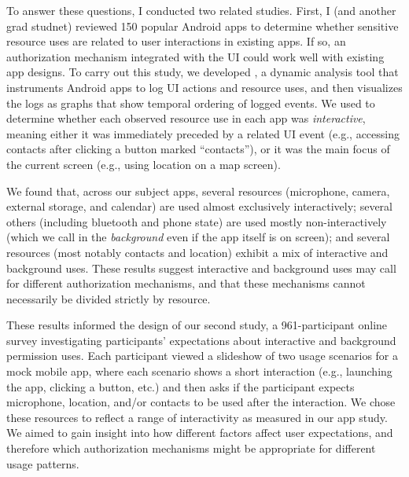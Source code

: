 To answer these questions, I conducted two related studies. First, I
(and another grad studnet) reviewed 150 popular Android apps to
determine whether sensitive resource uses are related to user
interactions in existing apps.  If so, an authorization mechanism
integrated with the UI could work well with existing app designs.  To
carry out this study, we developed \apptracer{}, a dynamic analysis
tool that instruments Android apps to log UI actions and resource
uses, and then visualizes the logs as graphs that show temporal
ordering of logged events.
We used \apptracer{} to determine whether each observed
resource use in each app was \emph{interactive}, meaning either it was
immediately preceded by a related UI event (e.g., accessing contacts
after clicking a button marked ``contacts''), or it was the main focus of
the current screen (e.g., using location on a map screen). 

We found that, across our subject apps, several resources (microphone,
camera, external storage, and calendar) are used almost exclusively
interactively; several others (including bluetooth and phone state)
are used mostly non-interactively (which we call in the
\emph{background} even if the app itself is on screen); and several
resources (most notably contacts and location) exhibit a mix of
interactive and background uses. These results suggest interactive and
background uses may call for different authorization mechanisms, and
that these mechanisms cannot necessarily be divided strictly by
resource.


These results informed the design of our second study, a
961-participant online survey investigating participants' expectations
about interactive and background permission uses. Each participant
viewed a slideshow of two usage scenarios for a mock mobile app, where
each scenario shows a short interaction (e.g., launching the app,
clicking a button, etc.) and then asks if the participant expects
microphone, location, and/or contacts to be used after the
interaction. We chose these resources to reflect a range of
interactivity as measured in our app study.  We aimed to gain insight
into how different factors
affect user expectations, and therefore which authorization mechanisms
might be appropriate for different usage patterns.
%

